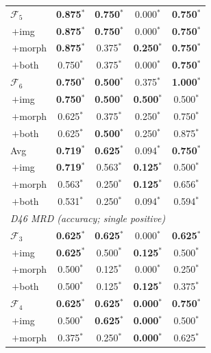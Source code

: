 \documentclass[pdflatex,sn-nature]{sn-jnl}
\begin{document}
\begin{table}[p]
\begin{tabular}{@{}l cccc@{}}
\addlinespace[0.3pt]
$\mathcal{F}_5$      & \textbf{0.875$^*$} & \textbf{0.750$^*$} & 0.000$^*$ & \textbf{0.750$^*$} \\
\;\,$+$img           & \textbf{0.875$^*$} & \textbf{0.750$^*$} & 0.000$^*$ & \textbf{0.750$^*$} \\
\;\,$+$morph         & \textbf{0.875$^*$} & 0.375$^*$ & \textbf{0.250$^*$} & \textbf{0.750$^*$} \\
\;\,$+$both          & 0.750$^*$ & 0.375$^*$ & 0.000$^*$ & \textbf{0.750$^*$} \\
\addlinespace[0.3pt]
$\mathcal{F}_6$      & \textbf{0.750$^*$} & \textbf{0.500$^*$} & 0.375$^*$ & \textbf{1.000$^*$} \\
\;\,$+$img           & \textbf{0.750$^*$} & \textbf{0.500$^*$} & \textbf{0.500$^*$} & 0.500$^*$ \\
\;\,$+$morph         & 0.625$^*$ & 0.375$^*$ & 0.250$^*$ & 0.750$^*$ \\
\;\,$+$both          & 0.625$^*$ & \textbf{0.500$^*$} & 0.250$^*$ & 0.875$^*$ \\
\addlinespace[2pt]
Avg & \textbf{0.719$^*$} & \textbf{0.625$^*$} & 0.094$^*$ & \textbf{0.750$^*$} \\
\;\,$+$img & \textbf{0.719$^*$} & 0.563$^*$ & \textbf{0.125$^*$} & 0.500$^*$ \\
\;\,$+$morph & 0.563$^*$ & 0.250$^*$ & \textbf{0.125$^*$} & 0.656$^*$ \\
\;\,$+$both & 0.531$^*$ & 0.250$^*$ & 0.094$^*$ & 0.594$^*$ \\
\midrule
\multicolumn{5}{l}{\textit{D46 MRD (accuracy; single positive)}} \\
$\mathcal{F}_3$      & \textbf{0.625$^*$} & \textbf{0.625$^*$} & 0.000$^*$ & \textbf{0.625$^*$} \\
\;\,$+$img           & \textbf{0.625$^*$} & 0.500$^*$ & \textbf{0.125$^*$} & 0.500$^*$ \\
\;\,$+$morph         & 0.500$^*$ & 0.125$^*$ & 0.000$^*$ & 0.250$^*$ \\
\;\,$+$both          & 0.500$^*$ & 0.125$^*$ & \textbf{0.125$^*$} & 0.375$^*$ \\
\addlinespace[0.3pt]
$\mathcal{F}_4$      & \textbf{0.625$^*$} & \textbf{0.625$^*$} & \textbf{0.000$^*$} & \textbf{0.750$^*$} \\
\;\,$+$img           & 0.500$^*$ & \textbf{0.625$^*$} & \textbf{0.000$^*$} & 0.500$^*$ \\
\;\,$+$morph         & 0.375$^*$ & 0.250$^*$ & \textbf{0.000$^*$} & 0.625$^*$ \\

\end{tabular}
\end{table}
\end{document}
